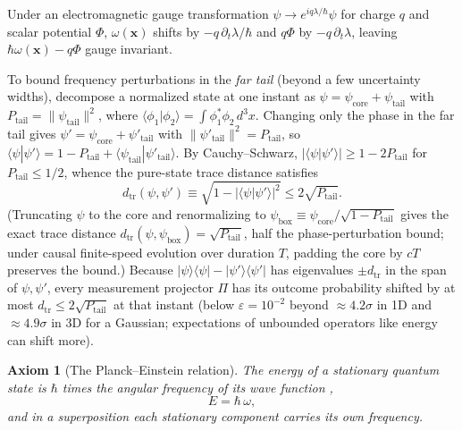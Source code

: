 \documentclass[aps,prd,onecolumn,tightenlines,nofootinbib,notitlepage,10pt,floatfix]{revtex4-2}
\theoremstyle{indentedtheorem}
\newtheorem{axiom}{Axiom}
\begin{document}
\noindent Under an electromagnetic gauge transformation $\psi\to e^{iq\lambda/\hbar}\psi$ for charge $q$ and scalar potential $\Phi$, $\omega(\mathbf{x})$ shifts by $-q\,\partial_t\lambda/\hbar$ and $q\Phi$ by $-q\,\partial_t\lambda$, leaving $\hbar\omega(\mathbf{x})-q\Phi$ gauge invariant.

To bound frequency perturbations in the \emph{far tail} (beyond a few uncertainty widths), decompose a normalized state at one instant as $\psi=\psi_\text{core}+\psi_\text{tail}$ with $P_\text{tail}=\|\psi_\text{tail}\|^2$, where $\langle\phi_1|\phi_2\rangle=\int\phi_1^*\phi_2\,d^3x$. Changing only the phase in the far tail gives $\psi'=\psi_\text{core}+\psi'_\text{tail}$ with $\|\psi'_\text{tail}\|^2=P_\text{tail}$, so $\langle\psi|\psi'\rangle=1-P_\text{tail}+\langle\psi_\text{tail}|\psi'_\text{tail}\rangle$. By Cauchy--Schwarz, $|\langle\psi|\psi'\rangle|\ge 1-2P_\text{tail}$ for $P_\text{tail}\le 1/2$, whence the pure-state trace distance satisfies
\begin{equation}
    d_\text{tr}(\psi,\psi') \equiv \sqrt{1-|\langle\psi|\psi'\rangle|^2} \le 2\sqrt{P_\text{tail}} .
    \label{eq:tail_distance}
\end{equation}
(Truncating $\psi$ to the core and renormalizing to $\psi_\text{box}\equiv\psi_\text{core}/\sqrt{1-P_\text{tail}}$ gives the exact trace distance $d_\text{tr}(\psi,\psi_\text{box})=\sqrt{P_\text{tail}}$, half the phase-perturbation bound; under causal finite-speed evolution over duration $T$, padding the core by $cT$ preserves the bound.) Because $|\psi\rangle\langle\psi|-|\psi'\rangle\langle\psi'|$ has eigenvalues $\pm d_\text{tr}$ in the span of $\psi,\psi'$, every measurement projector $\Pi$ has its outcome probability shifted by at most $d_\text{tr}\le 2\sqrt{P_\text{tail}}$ at that instant (below $\varepsilon=10^{-2}$ beyond $\approx 4.2\sigma$ in 1D and $\approx 4.9\sigma$ in 3D for a Gaussian; expectations of unbounded operators like energy can shift more).

\begin{axiom}[The Planck--Einstein relation]\label{ax:planck}
The energy of a stationary quantum state is $\hbar$ times the angular frequency of its wave function \citep{Planck1901Radiation,Einstein1905Photoelectric},
\begin{equation}
    E = \hbar \, \omega ,
    \label{eq:planck}
\end{equation}
and in a superposition each stationary component carries its own frequency.
\end{axiom}
\end{document}
